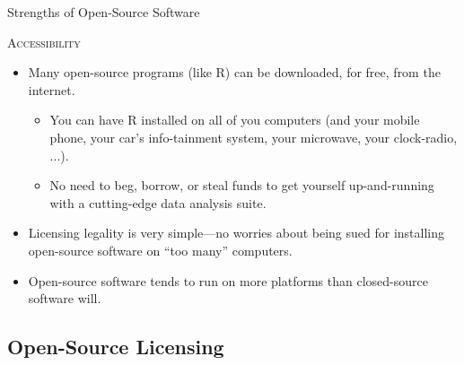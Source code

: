 \documentclass[10pt]{beamer}
\newcommand{\rmsc}[1]{\textrm{\textsc{#1}}}
\begin{document}

\begin{frame}{Strengths of Open-Source Software}

  \rmsc{Accessibility}
  \vb
  \begin{itemize}
  \item Many open-source programs (like R) can be downloaded, for free, from the 
    internet.
    \begin{itemize}
      \vb
    \item You can have R installed on all of you computers (and your mobile 
      phone, your car's info-tainment system, your microwave, your clock-radio,
      ...).
      \vb
    \item No need to beg, borrow, or steal funds to get yourself up-and-running 
      with a cutting-edge data analysis suite.
    \end{itemize}
    \vb
  \item Licensing legality is very simple---no worries about being sued for 
    installing open-source software on ``too many'' computers.
    \vb
  \item Open-source software tends to run on more platforms than closed-source 
    software will.
  \end{itemize}

\end{frame}


\subsection{Open-Source Licensing}

\end{document}
